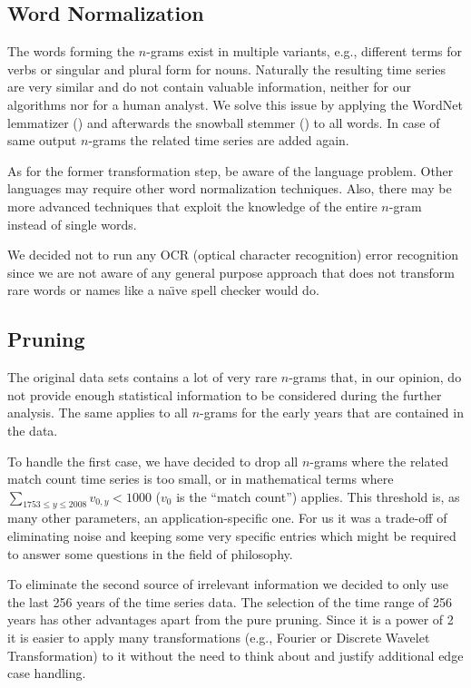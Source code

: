 \subsection{Word Normalization}
\label{ssec:baseline:data:wnorm}
The words forming the $n$-grams exist in multiple variants, e.g., different terms for verbs or singular and plural form for nouns. Naturally the resulting time series are very similar and do not contain valuable information, neither for our algorithms nor for a human analyst. We solve this issue by applying the WordNet lemmatizer (\cite{wordnet}) and afterwards the snowball stemmer (\cite{porter2}) to all words. In case of same output $n$-grams the related time series are added again.

As for the former transformation step, be aware of the language problem. Other languages may require other word normalization techniques. Also, there may be more advanced techniques that exploit the knowledge of the entire $n$-gram instead of single words.

We decided not to run any OCR (optical character recognition) error recognition since we are not aware of any general purpose approach that does not transform rare words or names like a na\"{\i}ve spell checker would do.


\subsection{Pruning}
\label{ssec:baseline:data:prune}
The original data sets contains a lot of very rare $n$-grams that, in our opinion, do not provide enough statistical information to be considered during the further analysis. The same applies to all $n$-grams for the early years that are contained in the data.

To handle the first case, we have decided to drop all $n$-grams where the related match count time series is too small, or in mathematical terms where $\sum_{1753 \leq y \leq 2008} v_{0, y} < 1000$ ($v_0$ is the \enquote{match count}) applies. This threshold is, as many other parameters, an application-specific one. For us it was a trade-off of eliminating noise and keeping some very specific entries which might be required to answer some questions in the field of philosophy.

To eliminate the second source of irrelevant information we decided to only use the last \num{256} years of the time series data. The selection of the time range of \num{256} years has other advantages apart from the pure pruning. Since it is a power of \num{2} it is easier to apply many transformations (e.g., Fourier or Discrete Wavelet Transformation) to it without the need to think about and justify additional edge case handling.

